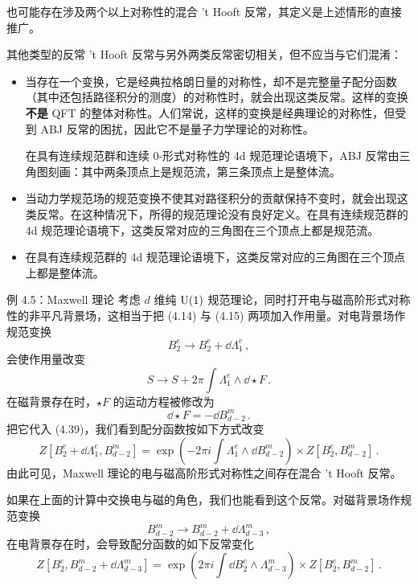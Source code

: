也可能存在涉及两个以上对称性的混合 't Hooft 反常，其定义是上述情形的直接推广。

\begin{notebox}{其他类型的反常}
't Hooft 反常与另外两类反常密切相关，但不应当与它们混淆：
\begin{itemize}[leftmargin=1.4em,itemsep=1pt,topsep=1pt]
\item {} 当存在一个变换，它是经典拉格朗日量的对称性，却不是完整量子配分函数（其中还包括路径积分的测度）的对称性时，就会出现这类反常。这样的变换\textbf{不是} QFT 的整体对称性。人们常说，这样的变换是经典理论的对称性，但受到 ABJ 反常的困扰，因此它不是量子力学理论的对称性。

在具有连续规范群和连续 0-形式对称性的 4d 规范理论语境下，ABJ 反常由三角图刻画：其中两条顶点上是规范流，第三条顶点上是整体流。
\item {} 当动力学规范场的规范变换不使其对路径积分的贡献保持不变时，就会出现这类反常。在这种情况下，所得的规范理论没有良好定义。在具有连续规范群的 4d 规范理论语境下，这类反常对应的三角图在三个顶点上都是规范流。
\item {} 在具有连续规范群的 4d 规范理论语境下，这类反常对应的三角图在三个顶点上都是整体流。
\end{itemize}
\end{notebox}

\begin{examplebox}{例 4.5：Maxwell 理论}
考虑 $d$ 维纯 $\mathrm{U}(1)$ 规范理论，同时打开电与磁高阶形式对称性的非平凡背景场，这相当于把 (4.14) 与 (4.15) 两项加入作用量。对电背景场作规范变换
\begin{equation}
  B^e_2\to B^e_2+\dd\Lambda^e_1\,, \tag{4.38}
\end{equation}
会使作用量改变
\begin{equation}
  S\to S+2\pi\int\Lambda^e_1\wedge\dd\star F\,. \tag{4.39}
\end{equation}
在磁背景存在时，$\star F$ 的运动方程被修改为
\begin{equation}
  \dd\star F=-\dd B^m_{d-2}\,. \tag{4.40}
\end{equation}
把它代入 (4.39)，我们看到配分函数按如下方式改变
\begin{equation}
  Z\left[B^e_2+\dd\Lambda^e_1,B^m_{d-2}\right]=\exp\left(-2\pi i\int\Lambda^e_1\wedge\dd B^m_{d-2}\right)\times Z\left[B^e_2,B^m_{d-2}\right]\,. \tag{4.41}
\end{equation}
由此可见，Maxwell 理论的电与磁高阶形式对称性之间存在混合 't Hooft 反常。

如果在上面的计算中交换电与磁的角色，我们也能看到这个反常。对磁背景场作规范变换
\begin{equation}
  B^m_{d-2}\to B^m_{d-2}+\dd\Lambda^m_{d-3}\,, \tag{4.42}
\end{equation}
在电背景存在时，会导致配分函数的如下反常变化
\begin{equation}
  Z\left[B^e_2,B^m_{d-2}+\dd\Lambda^m_{d-3}\right]=\exp\left(2\pi i\int\dd B^e_2\wedge\Lambda^m_{d-3}\right)\times Z\left[B^e_2,B^m_{d-2}\right]\,. \tag{4.43}
\end{equation}
\end{examplebox}

